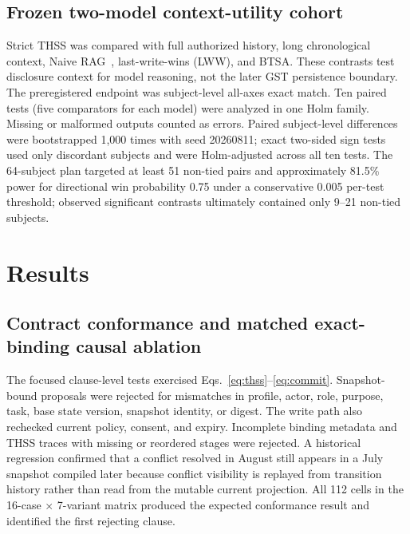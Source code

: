 \documentclass[11pt]{article}
\begin{document}
\subsection{Frozen two-model context-utility cohort}
Strict THSS was compared with full authorized history, long chronological context, Naive RAG~\cite{rag}, last-write-wins (LWW), and BTSA. These contrasts test disclosure context for model reasoning, not the later GST persistence boundary. The preregistered endpoint was subject-level all-axes exact match. Ten paired tests (five comparators for each model) were analyzed in one Holm family. Missing or malformed outputs counted as errors. Paired subject-level differences were bootstrapped 1,000 times with seed 20260811; exact two-sided sign tests used only discordant subjects and were Holm-adjusted across all ten tests. The 64-subject plan targeted at least 51 non-tied pairs and approximately 81.5\% power for directional win probability 0.75 under a conservative 0.005 per-test threshold; observed significant contrasts ultimately contained only 9--21 non-tied subjects.

\section{Results}
\subsection{Contract conformance and matched exact-binding causal ablation}
The focused clause-level tests exercised Eqs.~\ref{eq:thss}--\ref{eq:commit}. Snapshot-bound proposals were rejected for mismatches in profile, actor, role, purpose, task, base state version, snapshot identity, or digest. The write path also rechecked current policy, consent, and expiry. Incomplete binding metadata and THSS traces with missing or reordered stages were rejected. A historical regression confirmed that a conflict resolved in August still appears in a July snapshot compiled later because conflict visibility is replayed from transition history rather than read from the mutable current projection. All 112 cells in the 16-case $\times$ 7-variant matrix produced the expected conformance result and identified the first rejecting clause.
\end{document}
